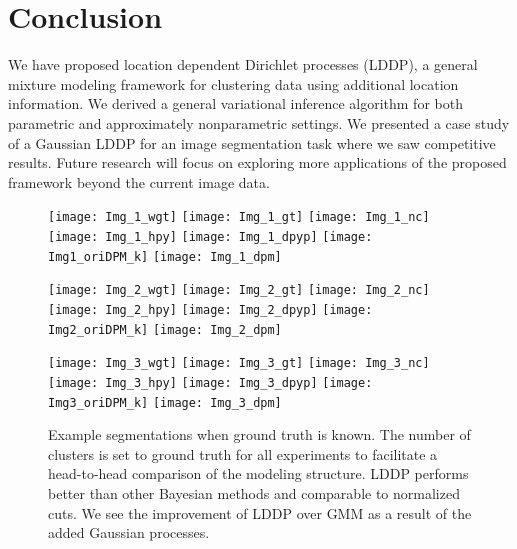 \documentclass[runningheads,a4paper]{iscide}
\begin{document}
\section{Conclusion}
We have proposed location dependent Dirichlet
processes (LDDP), a general mixture modeling framework for clustering data using additional location information. We derived a general variational inference algorithm for both parametric and approximately nonparametric settings. We presented a case study of a Gaussian LDDP for an image segmentation task where we saw competitive results. Future research will focus on exploring more applications of the proposed framework beyond the current image data.




\begin{figure}[th!]%
  \centering
  \texttt{[image: Img\_1\_wgt]}
  \texttt{[image: Img\_1\_gt]}
    \texttt{[image: Img\_1\_nc]}
\texttt{[image: Img\_1\_hpy]}
 \texttt{[image: Img\_1\_dpyp]}
  \texttt{[image: Img1\_oriDPM\_k]}
  \texttt{[image: Img\_1\_dpm]}

  \texttt{[image: Img\_2\_wgt]}
    \texttt{[image: Img\_2\_gt]}
  \texttt{[image: Img\_2\_nc]}
  \texttt{[image: Img\_2\_hpy]}
 \texttt{[image: Img\_2\_dpyp]}
  \texttt{[image: Img2\_oriDPM\_k]}
  \texttt{[image: Img\_2\_dpm]}

  \texttt{[image: Img\_3\_wgt]}
    \texttt{[image: Img\_3\_gt]}
  \texttt{[image: Img\_3\_nc]}
 \texttt{[image: Img\_3\_hpy]}
 \texttt{[image: Img\_3\_dpyp]}
  \texttt{[image: Img3\_oriDPM\_k]}
  \texttt{[image: Img\_3\_dpm]}\vspace{-5pt}

  \caption{Example segmentations when ground truth is known. The number of clusters is set to ground truth for all experiments to facilitate a head-to-head comparison of the modeling structure. LDDP performs better than other Bayesian methods and comparable to normalized cuts. We see the improvement of LDDP over GMM as a result of the added Gaussian processes.}
  \label{fig4ImageswGT}
\end{figure}





\end{document}
